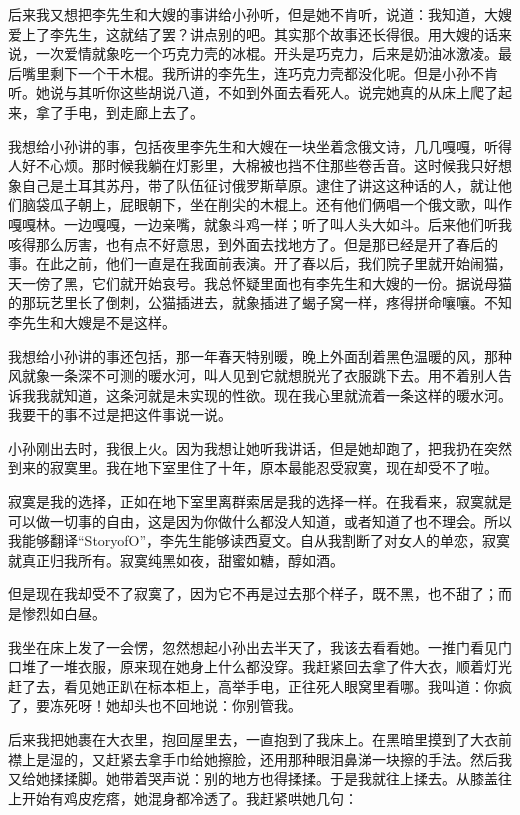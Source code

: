 后来我又想把李先生和大嫂的事讲给小孙听，但是她不肯听，说道：我知道，大嫂爱上了李先生，这就结了罢？讲点别的吧。其实那个故事还长得很。用大嫂的话来说，一次爱情就象吃一个巧克力壳的冰棍。开头是巧克力，后来是奶油冰激凌。最后嘴里剩下一个干木棍。我所讲的李先生，连巧克力壳都没化呢。但是小孙不肯听。她说与其听你这些胡说八道，不如到外面去看死人。说完她真的从床上爬了起来，拿了手电，到走廊上去了。 

我想给小孙讲的事，包括夜里李先生和大嫂在一块坐着念俄文诗，几几嘎嘎，听得人好不心烦。那时候我躺在灯影里，大棉被也挡不住那些卷舌音。这时候我只好想象自己是土耳其苏丹，带了队伍征讨俄罗斯草原。逮住了讲这这种话的人，就让他们脑袋瓜子朝上，屁眼朝下，坐在削尖的木棍上。还有他们俩唱一个俄文歌，叫作嘎嘎林。一边嘎嘎，一边亲嘴，就象斗鸡一样；听了叫人头大如斗。后来他们听我咳得那么厉害，也有点不好意思，到外面去找地方了。但是那已经是开了春后的事。在此之前，他们一直是在我面前表演。开了春以后，我们院子里就开始闹猫，天一傍了黑，它们就开始哀号。我总怀疑里面也有李先生和大嫂的一份。据说母猫的那玩艺里长了倒刺，公猫插进去，就象插进了蝎子窝一样，疼得拼命嚷嚷。不知李先生和大嫂是不是这样。 

我想给小孙讲的事还包括，那一年春天特别暖，晚上外面刮着黑色温暖的风，那种风就象一条深不可测的暖水河，叫人见到它就想脱光了衣服跳下去。用不着别人告诉我我就知道，这条河就是未实现的性欲。现在我心里就流着一条这样的暖水河。我要干的事不过是把这件事说一说。 

小孙刚出去时，我很上火。因为我想让她听我讲话，但是她却跑了，把我扔在突然到来的寂寞里。我在地下室里住了十年，原本最能忍受寂寞，现在却受不了啦。 

寂寞是我的选择，正如在地下室里离群索居是我的选择一样。在我看来，寂寞就是可以做一切事的自由，这是因为你做什么都没人知道，或者知道了也不理会。所以我能够翻译“StoryofO”，李先生能够读西夏文。自从我割断了对女人的单恋，寂寞就真正归我所有。寂寞纯黑如夜，甜蜜如糖，醇如酒。 

但是现在我却受不了寂寞了，因为它不再是过去那个样子，既不黑，也不甜了；而是惨烈如白昼。 

我坐在床上发了一会愣，忽然想起小孙出去半天了，我该去看看她。一推门看见门口堆了一堆衣服，原来现在她身上什么都没穿。我赶紧回去拿了件大衣，顺着灯光赶了去，看见她正趴在标本柜上，高举手电，正往死人眼窝里看哪。我叫道：你疯了，要冻死呀！她却头也不回地说：你别管我。 

后来我把她裹在大衣里，抱回屋里去，一直抱到了我床上。在黑暗里摸到了大衣前襟上是湿的，又赶紧去拿手巾给她擦脸，还用那种眼泪鼻涕一块擦的手法。然后我又给她揉揉脚。她带着哭声说：别的地方也得揉揉。于是我就往上揉去。从膝盖往上开始有鸡皮疙瘩，她混身都冷透了。我赶紧哄她几句： 

